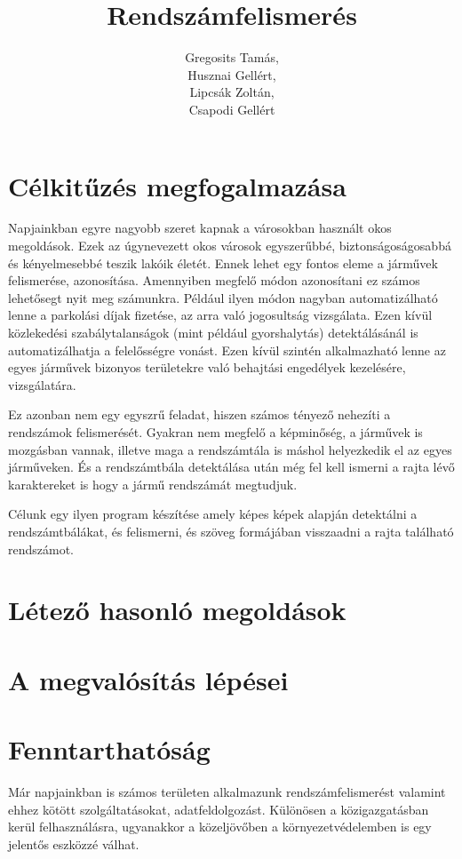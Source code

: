 \documentclass[12pt,a4paper]{article}
\author{Gregosits Tamás,\\Husznai Gellért,\\Lipcsák Zoltán,\\Csapodi Gellért}
\title{Rendszámfelismerés}
\begin{document}
\maketitle
\newpage
    \section{Célkitűzés megfogalmazása}
    Napjainkban egyre nagyobb szeret kapnak a városokban használt okos megoldások.
    Ezek az úgynevezett okos városok egyszerűbbé, biztonságoságosabbá és kényelmesebbé teszik lakóik életét.
    Ennek lehet egy fontos eleme a járművek felismerése, azonosítása. 
    Amennyiben megfelő módon azonosítani ez számos lehetősegt nyit meg számunkra.
    Például ilyen módon nagyban automatizálható lenne a parkolási díjak fizetése, 
    az arra való jogosultság vizsgálata. Ezen kívül közlekedési szabálytalanságok (mint például gyorshalytás)
    detektálásánál is automatizálhatja a felelősségre vonást. Ezen kívül szintén alkalmazható
    lenne az egyes járművek bizonyos területekre való behajtási engedélyek kezelésére, vizsgálatára.

    Ez azonban nem egy egyszrű feladat, hiszen számos tényező nehezíti a rendszámok felismerését.
    Gyakran nem megfelő a képminőség, a járművek is mozgásban vannak, illetve maga a rendszámtála is 
    máshol helyezkedik el az egyes járműveken. És a rendszámtbála detektálása után még fel kell 
    ismerni a rajta lévő karaktereket is hogy a jármű rendszámát megtudjuk.

    Célunk egy ilyen program készítése amely képes képek alapján detektálni a rendszámtbálákat,
    és felismerni, és szöveg formájában visszaadni a rajta található rendszámot.
    \section{Létező hasonló megoldások}
    \section{A megvalósítás lépései}
    \section{Fenntarthatóság}

        Már napjainkban is számos területen alkalmazunk rendszámfelismerést valamint ehhez kötött szolgáltatásokat, adatfeldolgozást. Különösen a közigazgatásban kerül felhasználásra, ugyanakkor a közeljövőben a környezetvédelemben is egy jelentős eszközzé válhat.
\end{document}
